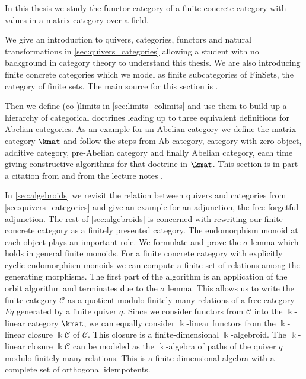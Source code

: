 In this thesis we study the functor category of a finite concrete category with values in a matrix category over a field.

We give an introduction to quivers, categories, functors and natural transformations in \cref{sec:quivers_categories} allowing a student with
no background in category theory to understand this thesis. We are also introducing finite concrete categories which we
model as finite subcategories of $\mathrm{FinSets}$, the category of finite sets.
The main source for this section is \cite[Chapter 1, Sections 1.1 - 1.4]{[context]}.

Then we define (co-)limits in \cref{sec:limits_colimits} and use them to build up a hierarchy of categorical doctrines leading up
to three equivalent definitions for Abelian categories.
As an example for an Abelian category we define the matrix category $\kmat$
and follow the steps from Ab-category, category with zero object, additive category, pre-Abelian category and
finally Abelian category, each time giving constructive algorithms for that doctrine in $\kmat$. This section is in part a 
citation from \cite[I.1.38-I.1.47 and I.2]{[Posur]} and from the lecture notes \cite{[AlgAlg]}.

In \cref{sec:algebroids} we revisit the relation between quivers and categories from \cref{sec:quivers_categories}
and give an example for an adjunction, the free-forgetful adjunction. The rest of \cref{sec:algebroids} is concerned with
rewriting our finite concrete category as a finitely presented category.
The endomorphism monoid at each object plays an important role. We formulate and prove the $\sigma$-lemma
which holds in general finite monoids. For a finite concrete category with explicitly
cyclic endomorphism monoids we can compute a finite set of relations among the generating morphisms. 
The first part of the algorithm is an application of the orbit algorithm and terminates due to the $\sigma$ lemma.
This allows us to write the finite category $\mathcal{C}$ as a quotient modulo finitely many relations of a free category $Fq$
generated by a finite quiver $q$.
Since we consider functors from $\mathcal{C}$ into the $\Bbbk$-linear category $\kmat$, we can equally consider $\Bbbk$-linear functors
from the $\Bbbk$-linear closure $\Bbbk\mathcal{C}$ of $\mathcal{C}$. This closure is a finite-dimensional $\Bbbk$-algebroid. 
The $\Bbbk$-linear closure $\Bbbk\mathcal{C}$ can be modeled as the $\Bbbk$-algebra of paths of the
quiver $q$ modulo finitely many relations. This is a finite-dimensional algebra with a complete set of orthogonal idempotents.

